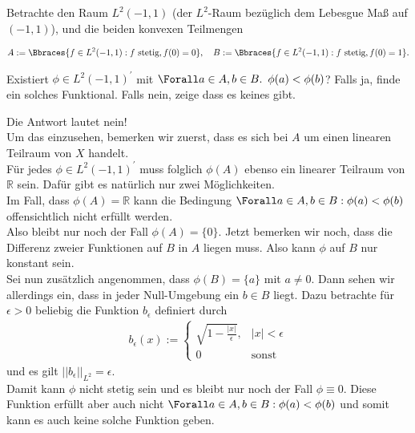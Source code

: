 \begin{exercise}

Betrachte den Raum $L^2(-1, 1)$ (der $L^2$-Raum bezüglich dem Lebesgue Maß auf $(-1, 1)$), und die beiden konvexen Teilmengen

\begin{align*}
  A := \Bbraces{f \in L^2(-1, 1): f \text{ stetig}, f(0) = 0},
  \quad
  B := \Bbraces{f \in L^2(-1, 1): f \text{ stetig}, f(0) = 1}.
\end{align*}

Existiert $\phi \in L^2(-1, 1)^\prime$ mit $\Forall a \in A, b \in B. \enspace \phi(a) < \phi(b)$?
Falls ja, finde ein solches Funktional.
Falls nein, zeige dass es keines gibt.

\end{exercise}

\begin{solution}

Die Antwort lautet nein! \\
Um das einzusehen, bemerken wir zuerst, dass es sich bei $A$ um einen linearen
Teilraum von $X$ handelt. \\
Für jedes $\phi \in L^2(-1, 1)^\prime$ muss folglich
$\phi(A)$ ebenso ein linearer Teilraum von $\mathbb{R}$ sein.
Dafür gibt es natürlich nur zwei Möglichkeiten. \\
Im Fall, dass $\phi(A) = \mathbb{R}$ kann die Bedingung $\Forall a \in A, b \in B: \phi(a) < \phi(b)$
offensichtlich nicht erfüllt werden. \\
Also bleibt nur noch der Fall $\phi(A) = \{0\}$.
Jetzt bemerken wir noch, dass die Differenz zweier Funktionen auf $B$ in $A$ liegen
muss. Also kann $\phi$ auf $B$ nur konstant sein. \\
Sei nun zusätzlich angenommen, dass $\phi(B) = \{a\}$ mit $a \neq 0$.
Dann sehen wir allerdings ein, dass in jeder Null-Umgebung ein $b \in B$ liegt.
Dazu betrachte für $\epsilon > 0$ beliebig die Funktion $b_{\epsilon}$ definiert durch
\begin{align*}
  b_{\epsilon}(x) := \begin{cases}
    \sqrt{1 - \frac{|x|}{\epsilon}}, & |x| < \epsilon \\
    0 & \text{sonst}
  \end{cases}
\end{align*}
und es gilt $||b_{\epsilon}||_{L^2} = \epsilon$. \\
Damit kann $\phi$ nicht stetig sein und es bleibt nur noch der Fall $\phi \equiv 0$.
Diese Funktion erfüllt aber auch nicht $\Forall a \in A, b \in B: \phi(a) < \phi(b)$
und somit kann es auch keine solche Funktion geben.
\end{solution}
